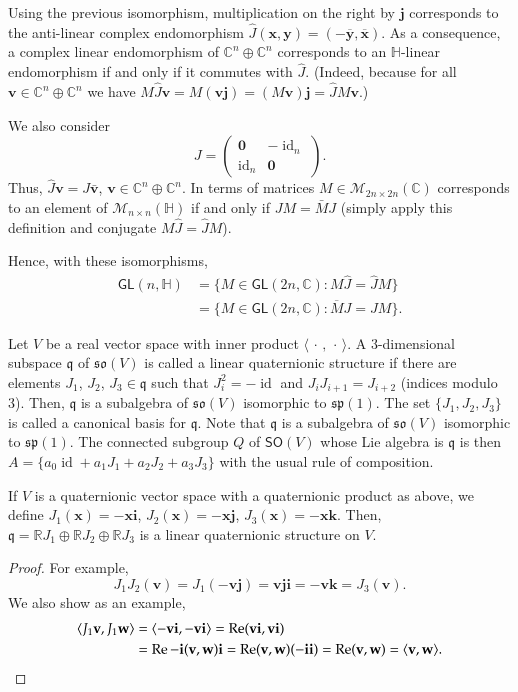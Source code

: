 \documentclass[12pt, a4paper]{amsart}
\newcommand{\id}{\operatorname{id}}
\newcommand{\g}{\mathfrak}
\newcommand{\R}{\mathbb{R}}
\newcommand{\C}{\mathbb{C}}
\renewcommand{\H}{\mathbb{H}}
\renewcommand{\Re}{\operatorname{Re}}
\theoremstyle{remark}
\begin{document}
Using the previous isomorphism, multiplication on the right by $\mathbf{j}$ corresponds to the anti-linear complex endomorphism $\hat{J}(\mathbf{x},\mathbf{y})=(-\overline{\mathbf{y}},\overline{\mathbf{x}})$.
As a consequence, a complex linear endomorphism of $\C^n\oplus\C^n$ corresponds to an $\H$-linear endomorphism if and only if it commutes with $\hat{J}$. 
(Indeed, because for all $\mathbf{v}\in\C^n\oplus\C^n$ we have $M\hat{J}\mathbf{v}=M(\mathbf{v}\mathbf{j})=(M\mathbf{v})\mathbf{j}=\hat{J}M\mathbf{v}$.)

We also consider
\[
{J}=
\begin{pmatrix}
\mathbf{0} & -\id_n\\
\id_n & \mathbf{0}
\end{pmatrix}.
\]
Thus, $\hat{J}\mathbf{v}=J\bar{\mathbf{v}}$, $\mathbf{v}\in\C^n\oplus\C^n$.
In terms of matrices $M\in\mathcal{M}_{2n\times 2n}(\C)$ corresponds to an element of $\mathcal{M}_{n\times n}(\H)$ if and only if $JM=\bar{M}J$
(simply apply this definition and conjugate $M\hat{J}=\hat{J}M$).

Hence, with these isomorphisms, 
\[
\begin{aligned}
\mathsf{GL}(n,\H)
&{}=\{M\in\mathsf{GL}(2n,\C):M\hat{J}=\hat{J}M\}\\
&{}=\{M\in\mathsf{GL}(2n,\C):\overline{M}J=JM\}.
\end{aligned}
\]
\medskip

Let $V$ be a real vector space with inner product $\langle\,\cdot\,,\,\cdot\,\rangle$.
A $3$-dimensional subspace $\g{q}$ of $\g{so}(V)$ is called a linear quaternionic structure if there are elements $J_1$, $J_2$, $J_3\in\g{q}$ such that $J_i^2=-\id$ and $J_iJ_{i+1}=J_{i+2}$ (indices modulo 3).
Then, $\g{q}$ is a subalgebra of $\g{so}(V)$ isomorphic to $\g{sp}(1)$.
The set $\{J_1,J_2,J_3\}$ is called a canonical basis for $\g{q}$.
Note that $\g{q}$ is a subalgebra of $\g{so}(V)$ isomorphic to $\g{sp}(1)$.
The  connected subgroup $Q$ of $\mathsf{SO}(V)$ whose Lie algebra is $\g{q}$ is then
$A=\{a_0\id+a_1 J_1+a_2 J_2+a_3 J_3\}$ with the usual rule of composition.

If $V$ is a quaternionic vector space with a quaternionic product as above, we define $J_1(\mathbf{x})=-\mathbf{x}\mathbf{i}$, $J_2(\mathbf{x})=-\mathbf{x}\mathbf{j}$, $J_3(\mathbf{x})=-\mathbf{x}\mathbf{k}$.
Then, $\g{q}=\R J_1\oplus\R J_2\oplus\R J_3$ is a linear quaternionic structure on $V$.

\begin{proof}
For example,
\[
J_1 J_2(\mathbf{v})
=J_1(-\mathbf{v}\mathbf{j})
=\mathbf{v}\mathbf{j}\mathbf{i}
=-\mathbf{v}\mathbf{k}
=J_3(\mathbf{v}).
\]
We also show as an example,
\begin{align*}
\langle J_1\mathbf{v},J_1\mathbf{w}\rangle
&{}=\langle -\mathbf{v}\mathbf{i},-\mathbf{v}\mathbf{i}\rangle
=\Re (\mathbf{v}\mathbf{i},\mathbf{v}\mathbf{i})\\
&{}=\Re -\mathbf{i} (\mathbf{v},\mathbf{w}) \mathbf{i}
=\Re (\mathbf{v},\mathbf{w}) (-\mathbf{i}\mathbf{i})
=\Re (\mathbf{v},\mathbf{w})
=\langle \mathbf{v},\mathbf{w}\rangle.\qedhere
\end{align*}
\end{proof}
\end{document}
